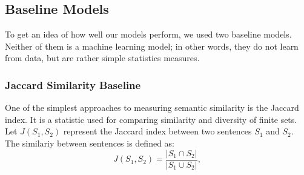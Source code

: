 \documentclass[10pt, a4paper]{article}
\begin{document}
%
%
%
\subsection{Baseline Models}

To get an idea of how well our models perform, we used two baseline models.
Neither of them is a machine learning model; in other words, they do not learn from data, but are rather simple statistics measures.

\subsubsection{Jaccard Similarity Baseline}

One of the simplest approaches to measuring semantic similarity is the Jaccard index.
It is a statistic used for comparing similarity and diversity of finite sets.
Let $J(S_1, S_2)$ represent the Jaccard index between two sentences $S_1$ and $S_2$.
The similariy between sentences is defined as:
\begin{equation}
	\label{eq:jaccard}
	J(S_1, S_2) = \frac{|S_1 \cap S_2|}{|S_1 \cup S_2|},
\end{equation}
\end{document}
